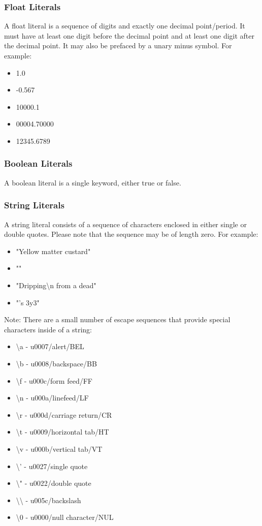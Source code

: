 \subsubsection{Float Literals}
A float literal is a sequence of digits and exactly one decimal point/period. It must have at least one digit before the decimal point and at least one digit after the decimal point. It may also be prefaced by a unary minus symbol. For example:
\begin{itemize}
\item 1.0
\item -0.567
\item 10000.1
\item 00004.70000
\item 12345.6789
\end{itemize}

\subsubsection{Boolean Literals}
A boolean literal is a single keyword, either true or false.

\subsubsection{String Literals}
A string literal consists of a sequence of characters enclosed in either single or double quotes. Please note that the sequence may be of length zero. For example:
\begin{itemize}
\item "Yellow matter custard"
\item ""
\item "Dripping\textbackslash{}n   from a dead"
\item "'s 3y3"
\end{itemize}

Note: There are a small number of escape sequences that provide special characters inside of a string:
\begin{itemize}
\item \textbackslash{}a - u0007/alert/BEL
\item \textbackslash{}b - u0008/backspace/BB
\item \textbackslash{}f - u000c/form feed/FF
\item \textbackslash{}n - u000a/linefeed/LF
\item \textbackslash{}r - u000d/carriage return/CR
\item \textbackslash{}t - u0009/horizontal tab/HT
\item \textbackslash{}v - u000b/vertical tab/VT
\item \textbackslash{}' - u0027/single quote
\item \textbackslash{}" - u0022/double quote
\item \textbackslash{}\textbackslash{} - u005c/backslash
\item \textbackslash{}0 - u0000/null character/NUL 
\end{itemize}
